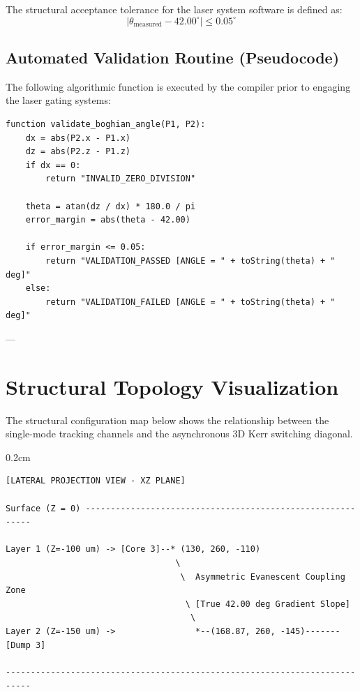 \documentclass[11pt,a4paper]{article}
\begin{document}
The structural acceptance tolerance for the laser system software is defined as:
\begin{equation}
|\theta_{\text{measured}} - 42.00^\circ| \le 0.05^\circ
\end{equation}

\subsection{Automated Validation Routine (Pseudocode)}
The following algorithmic function is executed by the compiler prior to engaging the laser gating systems:

\begin{lstlisting}
function validate_boghian_angle(P1, P2):
    dx = abs(P2.x - P1.x)
    dz = abs(P2.z - P1.z)
    if dx == 0:
        return "INVALID_ZERO_DIVISION"
        
    theta = atan(dz / dx) * 180.0 / pi
    error_margin = abs(theta - 42.00)
    
    if error_margin <= 0.05:
        return "VALIDATION_PASSED [ANGLE = " + toString(theta) + " deg]"
    else:
        return "VALIDATION_FAILED [ANGLE = " + toString(theta) + " deg]"
\end{lstlisting}

---

\section{Structural Topology Visualization}
The structural configuration map below shows the relationship between the single-mode tracking channels and the asynchronous 3D Kerr switching diagonal.

\begin{vspacespace}{0.2cm}
\begin{lstlisting}
[LATERAL PROJECTION VIEW - XZ PLANE]

Surface (Z = 0) -----------------------------------------------------------
                                                                           
Layer 1 (Z=-100 um) -> [Core 3]--* (130, 260, -110)                        
                                  \                                        
                                   \  Asymmetric Evanescent Coupling Zone  
                                    \ [True 42.00 deg Gradient Slope]      
                                     \                                     
Layer 2 (Z=-150 um) ->                *--(168.87, 260, -145)-------[Dump 3]

---------------------------------------------------------------------------
\end{lstlisting}
\end{vspacespace}
\end{document}
